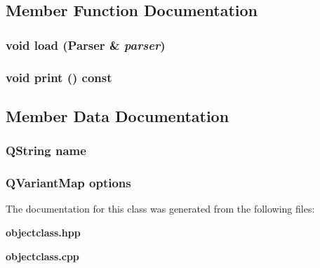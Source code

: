 \subsection{Member Function Documentation}
\subsubsection{\setlength{\rightskip}{0pt plus 5cm}void load ({\bf Parser} \& {\em parser})}\label{classObjectClass_a2}


\subsubsection{\setlength{\rightskip}{0pt plus 5cm}void print () const}\label{classObjectClass_a3}




\subsection{Member Data Documentation}
\subsubsection{\setlength{\rightskip}{0pt plus 5cm}QString {\bf name}}\label{classObjectClass_o0}


\subsubsection{\setlength{\rightskip}{0pt plus 5cm}QVariant\-Map {\bf options}}\label{classObjectClass_o1}




The documentation for this class was generated from the following files:\begin{CompactItemize}
\item 
{\bf objectclass.hpp}\item 
{\bf objectclass.cpp}\end{CompactItemize}
